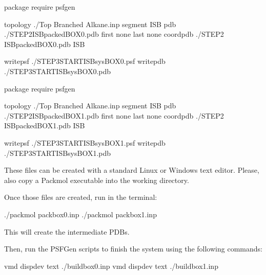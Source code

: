 \documentclass[letterpaper,10pt,english]{sphinxmanual}
\begin{document}
\sphinxAtStartPar
{}

\begin{sphinxVerbatim}[commandchars=\\\{\}]
package require psfgen

topology  ./Top Branched Alkane.inp segment ISB \PYGZob{}
  pdb     ./STEP2\PYGZus{}ISB\PYGZus{}packed\PYGZus{}BOX\PYGZus{}0.pdb
  first   none
  last    none
\PYGZcb{}
coordpdb  ./STEP2 ISB\PYGZus{}packed\PYGZus{}BOX\PYGZus{}0.pdb ISB

writepsf  ./STEP3\PYGZus{}START\PYGZus{}ISB\PYGZus{}sys\PYGZus{}BOX\PYGZus{}0.psf
writepdb  ./STEP3\PYGZus{}START\PYGZus{}ISB\PYGZus{}sys\PYGZus{}BOX\PYGZus{}0.pdb
\end{sphinxVerbatim}

\sphinxAtStartPar
{}

\begin{sphinxVerbatim}[commandchars=\\\{\}]
package require psfgen

topology  ./Top Branched Alkane.inp segment ISB \PYGZob{}
  pdb     ./STEP2\PYGZus{}ISB\PYGZus{}packed\PYGZus{}BOX\PYGZus{}1.pdb
  first   none
  last    none
\PYGZcb{}
coordpdb  ./STEP2 ISB\PYGZus{}packed\PYGZus{}BOX\PYGZus{}1.pdb ISB

writepsf  ./STEP3\PYGZus{}START\PYGZus{}ISB\PYGZus{}sys\PYGZus{}BOX\PYGZus{}1.psf
writepdb  ./STEP3\PYGZus{}START\PYGZus{}ISB\PYGZus{}sys\PYGZus{}BOX\PYGZus{}1.pdb
\end{sphinxVerbatim}

\sphinxAtStartPar
These files can be created with a standard Linux or Windows text editor. Please, also copy a Packmol executable into the working directory.

\sphinxAtStartPar
Once those files are created, run in the terminal:

\begin{sphinxVerbatim}[commandchars=\\\{\}]
\PYGZdl{} ./packmol   \PYGZlt{}   pack\PYGZus{}box\PYGZus{}0.inp
\PYGZdl{} ./packmol   \PYGZlt{}   pack\PYGZus{}box\PYGZus{}1.inp
\end{sphinxVerbatim}

\sphinxAtStartPar
This will create the intermediate PDBs.

\sphinxAtStartPar
Then, run the PSFGen scripts to finish the system using the following commands:

\begin{sphinxVerbatim}[commandchars=\\\{\}]
\PYGZdl{} vmd \PYGZhy{}dispdev text \PYGZlt{} ./build\PYGZus{}box\PYGZus{}0.inp
\PYGZdl{} vmd \PYGZhy{}dispdev text \PYGZlt{} ./build\PYGZus{}box\PYGZus{}1.inp
\end{sphinxVerbatim}
\end{document}
